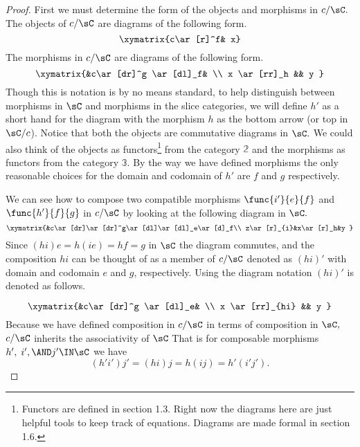 \documentclass[../../main]{subfiles}
\begin{document}
\begin{proof}
	First we must determine the form of the objects and morphisms in \(c/\sC.\)
	The objects of \(c/\sC\) are diagrams of the following form.
	\[ \xymatrix{c\ar[r]^f& x} \]
	The morphisms in \(c/\sC\) are diagrams of the following form.
	\[ \xymatrix{&c\ar[dr]^g \ar[dl]_f& \\ x \ar[rr]_h && y } \]
	Though this is notation is by no means standard, to help distinguish between
	morphisms in \(\sC\) and morphisms in the slice categories, we will
	define \(h'\) as a short hand for the diagram with the morphism \(h\) as the
	bottom arrow (or top in \(\sC/c\)). Notice that both the objects are
	commutative diagrams in \(\sC.\) We could also think of the objects as
	functors\footnote{Functors are defined in section 1.3. Right now the diagrams here are just helpful tools to keep track of equations. Diagrams are made formal in section 1.6.} from  the category \(\mathbb{2}\) and the morphisms as functors
	from the category \(\mathbb{3}.\) By the way we have defined morphisms the
	only reasonable choices for the domain and codomain of \(h'\) are \(f\) and
	\(g\) respectively.

	We can see how to compose two compatible morphisms \(\func{i'}{e}{f}\) and
	\(\func{h'}{f}{g}\) in \(c/\sC\) by looking at the following diagram in
	\(\sC.\)
	\[ \xymatrix{&c\ar[dr]\ar[dr]^g\ar[dl]\ar[dl]_e\ar[d]_f\\
	z\ar[r]_{i}&x\ar[r]_h&y } \]
	Since \((hi)e=h(ie)=hf=g\) in \(\sC\) the diagram commutes, and the
	composition \(hi\) can be thought of as a member of \(c/\sC\) denoted as
	\((hi)'\) with domain and codomain \(e\) and \(g\), respectively. Using the diagram
	notation \((hi)'\) is denoted as follows.

	\[ \xymatrix{&c\ar[dr]^g \ar[dl]_e& \\ x \ar[rr]_{hi} && y } \]
	Because we have defined composition in \(c/\sC\) in terms of composition
	in \(\sC,\) \(c/\sC\) inherits the associativity of \(\sC\) That
	is for composable morphisms  \(h',\;i',\AND j' \IN \sC\) we have
	\[ (h'i')j'=(hi)j=h(ij)=h'(i'j'). \]


\end{proof}
\end{document}
